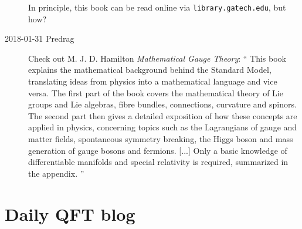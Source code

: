\begin{description}
In principle, this book can be read online via
\texttt{library.gatech.edu}, but how?

\item[2018-01-31 Predrag] Check out
M. J. D. Hamilton
{\em Mathematical Gauge Theory}: ``
This book explains the mathematical background behind the Standard Model,
translating ideas from physics into a mathematical language and vice versa.
The first part of the book covers the mathematical theory of Lie groups and
Lie algebras, fibre bundles, connections, curvature and spinors. The second
part then gives a detailed exposition of how these concepts are applied in
physics, concerning topics such as the Lagrangians of gauge and matter
fields, spontaneous symmetry breaking, the Higgs boson and mass generation of
gauge bosons and fermions.
[...] Only a basic knowledge of differentiable manifolds and special
relativity is required, summarized in the appendix.
''


\end{description}


\section{Daily QFT blog}
\label{s-DailyBlog}

